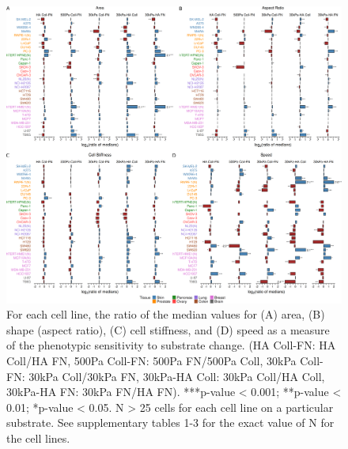 \documentclass[11pt,letterpaper,english,oneside]{article} %
\begin{document}
\begin{figure}[H]
    \hspace*{-2cm}
    \centering
    \includegraphics[scale=0.13]{../Figures/Supplementary_Figure2/supplementary_figure2.png}
    \caption{For each cell line, the ratio of the median values for (A) area, (B) shape (aspect ratio), (C) cell stiffness, and (D) speed as a measure of the phenotypic sensitivity to substrate change. 
    (HA Coll-FN: HA Coll/HA FN, 500Pa Coll-FN: 500Pa FN/500Pa Coll, 30kPa Coll-FN: 30kPa Coll/30kPa FN, 30kPa-HA Coll: 30kPa Coll/HA Coll, 30kPa-HA FN: 30kPa FN/HA FN). 
    ***p-value < 0.001; **p-value < 0.01; *p-value < 0.05. N > 25 cells for each cell line on a particular substrate. See supplementary tables 1-3 for the exact value of N for the cell lines.}
    \label{fig:fig2}
\end{figure}
\end{document}
